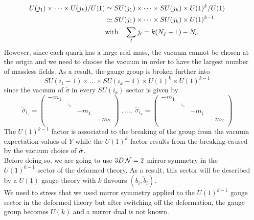 \begin{align} 
U(j_1) \times \dots \times U(j_k) / U(1) &  \simeq  SU(j_1) \times \dots \times SU(j_k) \times U(1)^{k}/U(1) \\  
 & \simeq  SU(j_1) \times \dots \times SU(j_k) \times U(1)^{k-1}\\
 & \hbox{with} \quad\sum_l j_l = k (N_f+1) - N_c  \;
\end{align} 
However, since each quark has a large real mass, the vacuum cannot be chosen at the origin and we need to choose the vacuum in order to have the largest number of massless fields.
As a result, the gauge group is broken further into
\begin{equation}
SU(i_1 -1 ) \times \dots \times SU(i_k -1 ) \times U(1)^{k} \times U(1)^{k-1}
\end{equation}
since the vacuum of $\tilde{\sigma}$ in every $SU(i_k)$ sector is given by  
\begin{equation}
\tilde{\sigma}_{i_1} = 
\begin{pmatrix}
 - m_1 & \\
  & \ddots  \\
  & & - m_1 & \\
  & & & - m_2 \\
\end{pmatrix}
 \; ,
 \dotsc 
,
\;
\tilde{\sigma}_{i_k} = 
\begin{pmatrix}
 - m_1 & \\
  & \ddots  \\
  & & - m_1 & \\
  & & & - m_2 \\
\end{pmatrix}
\label{eqn:reduction_sun_sigma_vev}
\end{equation}
The $U(1)^{k-1}$ factor is associated to the breaking of the group from the vacuum expectation values of $Y$ while the $U(1)^k$ factor results from the breaking caused by the vacuum choice of $\tilde{ \sigma}$.\\
Before doing so, we are going to use $3D \, \mathcal{N}=2$ mirror symmetry \cite{Aharony:1997bx} in the $U(1)^{k-1}$ sector of the deformed theory.
As a result, this sector will be described by a $ U(1)$  gauge theory with $k$ flavours $(b_i, \tilde{b}_i)$.\\
We need to stress that we used mirror symmetry applied to the $U(1)^{k-1}$ gauge sector in the deformed theory but after switching off the deformation, the gauge group becomes $U(k)$ and a mirror dual is not known.\\
